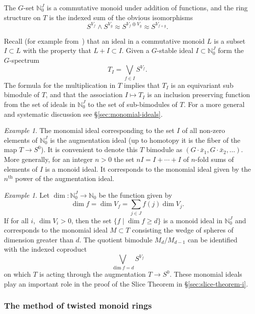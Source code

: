 \documentclass{amsart}
\theoremstyle{definition}
\theoremstyle{remark}
\newtheorem{eg}[equation]{Example}
\newcommand{\gbar}{\bar}
\newcommand{\nat}{\mathbb N_{0}}
\begin{document}
The $G$-set $\nat^{J}$ is a commutative monoid under addition of
functions, and the ring structure on $T$ is the indexed sum of the
obvious isomorphisms
\[
S^{V_{f}}\wedge S^{V_{g}} \approx S^{V_{f}\oplus V_{g}}\approx
S^{V_{f+g}}.
\]

Recall (for example from~\cite{MR0132791}) that an ideal in a
commutative monoid $L$ is a subset $I\subset L$ with the property that
$L+I\subset I$.   Given a $G$-stable ideal $I\subset \nat^{J}$ form the
$G$-spectrum
\[
T_{I} = \bigvee_{f\in I} S^{V_{f}}.
\]
The formula for the multiplication in $T$ implies that $T_{I}$ is an
equivariant sub bimodule of $T$, and that the association $I\mapsto
T_{I}$ is an inclusion preserving function from the set of ideals in
$\nat^{J}$ to the set of sub-bimodules of $T$.  For a more general and
systematic discussion see \S\ref{sec:monomial-ideals}.  

\begin{eg}
\label{eg:11} The monomial ideal corresponding to the set $I$ of all
non-zero elements of $\nat^{J}$ is the augmentation ideal (up to
homotopy it is the fiber of the map $T\to S^{0}$).  It is convenient
to denote this $T$ bimodule as $(G\cdot\gbar{x}_{1},
G\cdot\gbar{x}_{2},\dots )$.  More generally, for an integer $n>0$ the
set $nI = I+\cdots+I$ of $n$-fold sums of elements of $I$ is a monoid
ideal.  It corresponds to the monomial ideal given by the
$n^{\text{th}}$ power of the augmentation ideal.
\end{eg}


\begin{eg}
\label{eg:9}
Let $\dim:\nat^{J}\to
\nat$ be the function given by
\[
\dim f = \dim V_{f}=\sum_{j\in J} f(j)\dim V_{j}.
\]
If for all $i$, $\dim V_{i}>0$, then the set $\{f\mid \dim f\ge d\}$
is a monoid ideal in $\nat^{J}$ and corresponds to the monomial ideal
$M\subset T$ consisting the wedge of spheres of dimension greater
than $d$.  The quotient bimodule $M_{d}/M_{d-1}$ can be identified
with the indexed coproduct
\[
\bigvee_{\dim f=d} S^{V_{f}}
\]
on which $T$ is acting through the augmentation $T\to S^{0}$.  These
monomial ideals play an important role in the proof of the Slice
Theorem in \S\ref{sec:slice-theorem-i}.
\end{eg}



\subsubsection{The method of twisted monoid rings}
\label{sec:weakly-comm-algebr}
\end{document}
